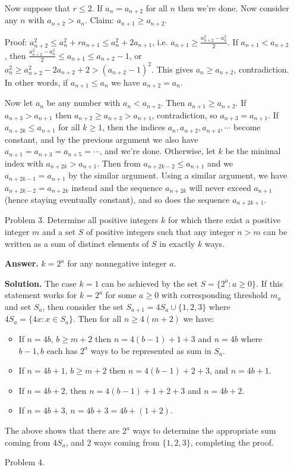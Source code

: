 \documentclass[11pt,a4paper]{article}
\begin{document}
\begin{enumerate}
	Now suppose that $r\le 2$. If $a_n=a_{n+2}$ for all $n$ then we're done. Now consider any $n$ with $a_{n+2}>a_n$. Claim: $a_{n+1}\ge a_{n+2}$. 
	
	Proof: $a_{n+2}^2\le a_n^2+ra_{n+1}\le a_n^2+2a_{n+1}$, i.e. $a_{n+1}\ge \frac{a_{n+2}^2 - a_n^2}{2}$. If $a_{n+1}<a_{n+2}$, then $\frac{a_{n+2}^2 - a_n^2}{2}\le a_{n+1}\le a_{n+2}-1$, or $a_n^2\ge a_{n+2}^2-2a_{n+2}+2> (a_{n+2}-1)^2$. 
	This gives $a_n\ge a_{n+2}$, contradiction. 
	In other words, if $a_{n+1}\le a_n$ we have $a_{n+2}=a_n$. 
	
	Now let $a_n$ be any number with $a_n<a_{n+2}$. Then $a_{n+1}\ge a_{n+2}$. If $a_{n+3}>a_{n+1}$ then $a_{n+2}\ge a_{n+3}>a_{n+1}$, contradiction, so $a_{n+3}=a_{n+1}$. 
	If $a_{n+2k}\le a_{n+1}$ for all $k\ge 1$, then the indices $a_n, a_{n+2}, a_{n+4},\cdots$ become constant, and by the previous argument we also have $a_{n+1}=a_{n+3}=a_{n+5}=\cdots$, and we're done. 
	Otherwise, let $k$ be the minimal index with $a_{n+2k}>a_{n+1}$. Then from $a_{n+2k-2}\le a_{n+1}$ and we $a_{n+2k-1}=a_{n+1}$ by the similar argument. 
	Using a similar argument, we have $a_{n+2k-2}=a_{n+2k}$ instead and the sequence $a_{n+2k}$ will never exceed $a_{n+1}$ (hence staying eventually constant), and so does the sequence $a_{n+2k+1}$. 
	
	\item [Problem 3.]
	Determine all positive integers $k$ for which there exist a positive integer $m$ and a set $S$ of positive integers such that any integer $n > m$ can be written as a sum of distinct elements of $S$ in exactly $k$ ways.
	
	\textbf{Answer.} $k=2^a$ for any nonnegative integer $a$. 
	
	\textbf{Solution.} The case $k=1$ can be achieved by the set $S=\{2^a: a\ge 0\}$. 
	If this statement works for $k=2^a$ for some $a\ge 0$ with corresponding threshold $m_a$ and set $S_a$, then consider the set $S_{a+1}=4S_a\cup\{1, 2, 3\}$ where $4S_a=\{4x: x\in S_a\}$. 
	Then for all $n\ge 4(m+2)$ we have:
	\begin{itemize}
		\item If $n=4b$, $b\ge m+2$ then $n=4(b-1)+1+3$ and $n=4b$ where $b-1, b$ each has $2^a$ ways to be represented as sum in $S_a$. 
		\item If $n=4b+1$, $b\ge m+2$ then $n=4(b-1)+2+3$, and $n=4b+1$. 
		\item If $n=4b+2$, then $n=4(b-1)+1+2+3$ and $n=4b+2$. 
		\item If $n=4b+3$, $n=4b+3=4b+(1+2)$. 
	\end{itemize}
	The above shows that there are $2^a$ ways to determine the appropriate sum coming from $4S_a$, and 2 ways coming from $\{1, 2, 3\}$, completing the proof. 
	
	\item [Problem 4.]
	
	
\end{enumerate}
\end{document}
